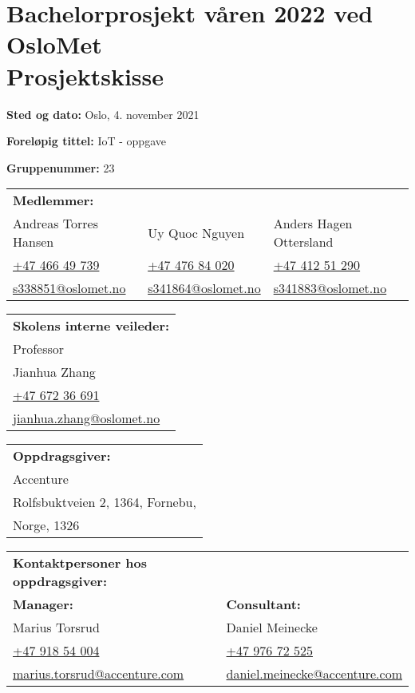 \documentclass[11pt, a4paper, norsk]{report}
\begin{document}
\section*{
\centering Bachelorprosjekt våren 2022 ved OsloMet\\
Prosjektskisse
}
\textbf{Sted og dato:} Oslo, 4. november 2021

\textbf{Foreløpig tittel:} IoT - oppgave

\textbf{Gruppenummer:} 23

\begin{tabular}{lll}
    \textbf{Medlemmer:}\\
    Andreas Torres Hansen & Uy Quoc Nguyen & Anders Hagen Ottersland \\
	\href{tel:+4746649739}{+47 466 49 739} & \href{tel:+4747684020}{+47 476 84 020} & \href{tel:+4741251290}{+47 412 51 290}\\
	\href{mailto:s338851@oslomet.no}{s338851@oslomet.no} & \href{mailto:s341864@oslomet.no}{s341864@oslomet.no} & \href{mailto:s341883@oslomet.no}{s341883@oslomet.no}
\end{tabular}

\begin{tabular}{l}
    \textbf{Skolens interne veileder:}\\
    Professor\\
    Jianhua Zhang\\
    \href{tel:+4767236691}{+47 672 36 691}\\
    \href{mailto:jianhua.zhang@oslomet.no}{jianhua.zhang@oslomet.no}
\end{tabular}

\begin{tabular}{l}
    \textbf{Oppdragsgiver:}\\
    Accenture\\
    Rolfsbuktveien 2, 1364, Fornebu,\\
    Norge, 1326
\end{tabular}


\begin{tabular}{ll}
    \textbf{Kontaktpersoner hos oppdragsgiver:}\\
    \textbf{Manager:}& \textbf{Consultant:}\\
    Marius Torsrud & Daniel Meinecke\\
    \href{tel:+4791854004}{+47 918 54 004} & \href{tel:+4797672525}{+47 976 72 525}\\
    \href{mailto:marius.torsrud@accenture.com}{marius.torsrud@accenture.com} & \href{mailto:daniel.meinecke@accenture.com}{daniel.meinecke@accenture.com}
\end{tabular}
\end{document}
